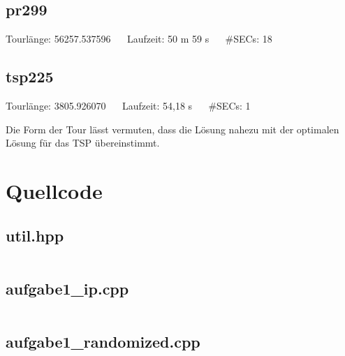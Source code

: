 \documentclass[a4paper, 10pt, ngerman]{article}
\begin{document}
\subsection{pr299}



\noindent Tourlänge: 56257.537596 $\quad$ Laufzeit: 50 m 59 s $\quad$ \#SECs: 18

\subsection{tsp225}



\noindent Tourlänge: 3805.926070 $\quad$ Laufzeit: 54,18 s $\quad$ \#SECs: 1
\medskip

\noindent Die Form der Tour lässt vermuten, dass die Lösung nahezu mit der optimalen Lösung für das TSP übereinstimmt.

\section{Quellcode}

\subsection{util.hpp}

\inputminted{c++}{aufgabe1/util.hpp}

\subsection{aufgabe1\_ip.cpp}

\inputminted{c++}{aufgabe1/aufgabe1_ip.cpp}

\subsection{aufgabe1\_randomized.cpp}

\inputminted{c++}{aufgabe1/aufgabe1_randomized.cpp}
\end{document}

